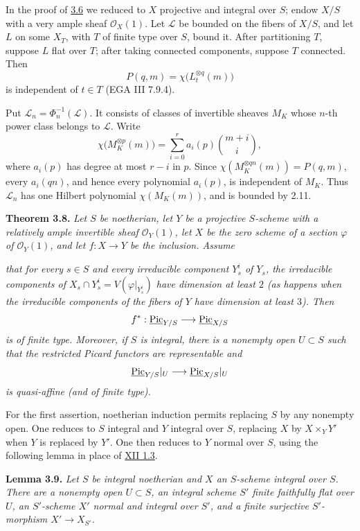 In the proof of \hyperlink{sga6.e13.thm.3-6}{3.6} we reduced to \(X\) projective and integral over \(S\);
endow \(X/S\) with a very ample sheaf \(\mathcal O_X(1)\). Let
\(\mathscr L\) be bounded on the fibers of \(X/S\), and let \(L\) on some
\(X_T\), with \(T\) of finite type over \(S\), bound it. After
partitioning \(T\), suppose \(L\) flat over \(T\); after taking connected
components, suppose \(T\) connected. Then
\[
P(q,m)=\chi\bigl(L_t^{\otimes q}(m)\bigr)
\]
is independent of \(t\in T\) (EGA III 7.9.4).

Put \(\mathscr L_n=\Phi_n^{-1}(\mathscr L)\). It consists of classes of
invertible sheaves \(M_K\) whose \(n\)-th power class belongs to
\(\mathscr L\). Write
\[
\chi\bigl(M_K^{\otimes p}(m)\bigr)
=\sum_{i=0}^{r}a_i(p)\binom{m+i}{i},
\]
where \(a_i(p)\) has degree at most \(r-i\) in \(p\). Since
\(\chi(M_K^{\otimes qn}(m))=P(q,m)\), every \(a_i(qn)\), and hence every
polynomial \(a_i(p)\), is independent of \(M_K\). Thus \(\mathscr L_n\)
has one Hilbert polynomial \(\chi(M_K(m))\), and is bounded by 2.11.

\textbf{Theorem 3.8.} \emph{Let \(S\) be noetherian, let \(Y\) be a
projective \(S\)-scheme with a relatively ample invertible sheaf
\(\mathcal O_Y(1)\), let \(X\) be the zero scheme of a section \(\varphi\)
of \(\mathcal O_Y(1)\), and let \(f:X\to Y\) be the inclusion. Assume}

\emph{that for every \(s\in S\) and every irreducible component \(Y_s^i\)
of \(Y_s\), the irreducible components of
\(X_s\cap Y_s^i=V(\varphi|_{Y_s^i})\) have dimension at least \(2\)
(as happens when the irreducible components of the fibers of \(Y\) have
dimension at least \(3\)). Then}
\[
f^*:\underline{\operatorname{Pic}}_{Y/S}\longrightarrow\underline{\operatorname{Pic}}_{X/S}
\]
\emph{is of finite type. Moreover, if \(S\) is integral, there is a
nonempty open \(U\subset S\) such that the restricted Picard functors
are representable and}
\[
\underline{\operatorname{Pic}}_{Y/S}|_U\longrightarrow\underline{\operatorname{Pic}}_{X/S}|_U
\]
\emph{is quasi-affine (and of finite type).}

For the first assertion, noetherian induction permits replacing \(S\) by
any nonempty open. One reduces to \(S\) integral and \(Y\) integral over
\(S\), replacing \(X\) by \(X\times_Y Y'\) when \(Y\) is replaced by
\(Y'\). One then reduces to \(Y\) normal over \(S\), using the following
lemma in place of \hyperlink{sga6.e12.lem.1-3}{XII 1.3}.

\textbf{Lemma 3.9.} \emph{Let \(S\) be integral noetherian and \(X\) an
\(S\)-scheme integral over \(S\). There are a nonempty open \(U\subset S\),
an integral scheme \(S'\) finite faithfully flat over \(U\), an
\(S'\)-scheme \(X'\) normal and integral over \(S'\), and a finite
surjective \(S'\)-morphism \(X'\to X_{S'}\).}

